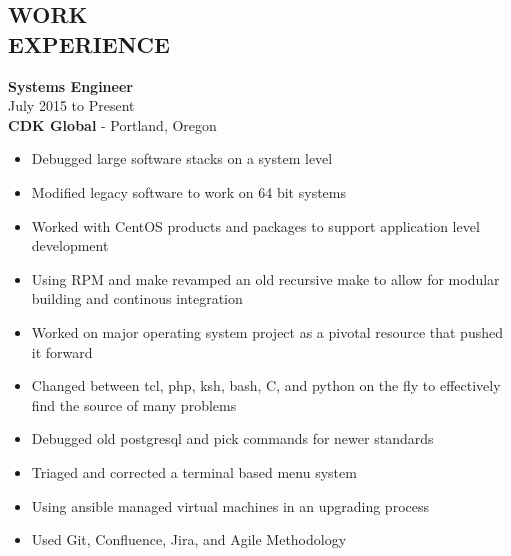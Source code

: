 \documentclass[mm]{res}
\begin{document}
\begin{resume}
\section{WORK \\ EXPERIENCE}  
	\textbf{Systems Engineer} \\
	July 2015 to Present \\
	\textbf{CDK Global} - Portland, Oregon \\
\begin{itemize} \parskip0pt  \itemsep-8pt
	\item Debugged large software stacks on a system level \\
	\item Modified legacy software to work on 64 bit systems \\
	\item Worked with CentOS products and packages to support application level development \\
	\item Using RPM and make revamped an old recursive make to allow for modular building and continous integration \\
	\item Worked on major operating system project as a pivotal resource that pushed it forward \\
	\item Changed between tcl, php, ksh, bash, C, and python on the fly to effectively find the source of many problems \\
	\item Debugged old postgresql and pick commands for newer standards \\
	\item Triaged and corrected a terminal based menu system \\
	\item Using ansible managed virtual machines in an upgrading process \\
	\item Used Git, Confluence, Jira, and Agile Methodology \\
 

\end{itemize}
\end{resume}
\end{document}
